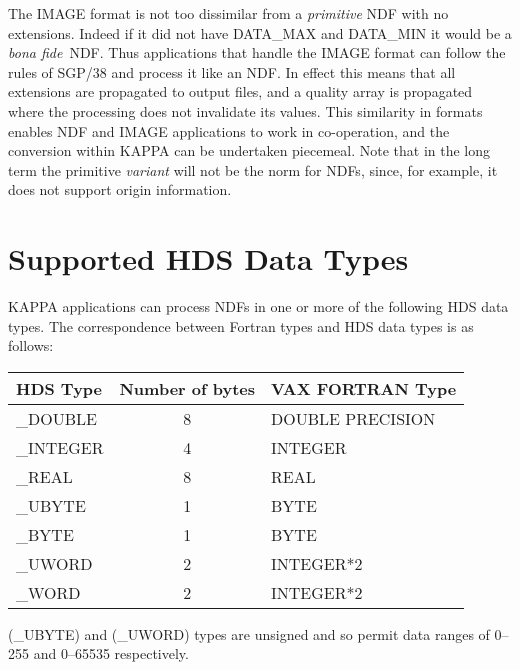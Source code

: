 {The IMAGE format is not too dissimilar from a {\em primitive\/} NDF with
no extensions.  Indeed if it did not have DATA\_MAX and DATA\_MIN it would
be a {\it bona fide}\ NDF.  Thus applications that handle the IMAGE 
format can follow the rules of SGP/38 and process it like an NDF.  In
effect this means that all extensions are propagated to output files,
and a quality array is propagated where the processing does not 
invalidate its values.  This similarity in formats enables NDF and
IMAGE applications to work in co-operation, and the conversion within
{\small KAPPA} can be undertaken piecemeal.  Note that in the long
term the primitive {\em variant\/} will not be the norm for NDFs, since,
for example, it does not support origin information.

\section{Supported HDS Data Types}
\label{ap:HDStypes}
{\small KAPPA} applications can process NDFs in one or more of
the following HDS data types.
The correspondence between Fortran types and HDS data types is as follows:

\begin{center}
\begin{tabular}{|l|c|l|} \hline
{\bf HDS Type} & {\bf Number of bytes} & {\bf VAX FORTRAN Type}\\ \hline
\_DOUBLE & 8 & DOUBLE PRECISION \\
\_INTEGER & 4 & INTEGER \\
\_REAL & 8 & REAL \\
\_UBYTE & 1 & BYTE \\
\_BYTE & 1 & BYTE \\
\_UWORD & 2 & INTEGER*2 \\
\_WORD & 2 & INTEGER*2\\
\hline
\end{tabular}
\end{center}

(\_UBYTE) and (\_UWORD) types are unsigned and so permit data ranges of
0--255 and 0--65535 respectively.

\newpage
}
